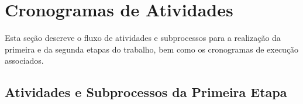 \section{Cronogramas de Atividades}
\label{mtd-cronograma}

Esta seção descreve o fluxo de atividades e subprocessos para a realização da primeira e da segunda etapas do trabalho, bem como os cronogramas de execução associados.

\subsection{Atividades e Subprocessos da Primeira Etapa}
\label{met-atividades-primeira-etapa}
	



